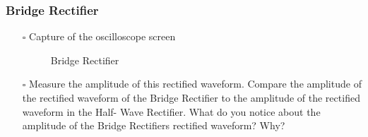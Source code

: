 \documentclass[12pt]{article}
\begin{document}
\subsubsection*{Bridge Rectifier}
\begin{enumerate}
\item[$\square$] Capture of the oscilloscope screen
\begin{figure}[h]
\centering
\caption{Bridge Rectifier}
\label{fig:half-wave}
\end{figure}
\item[$\square$] Measure the amplitude of this rectified waveform.
Compare the amplitude of the rectified waveform of the Bridge
Rectifier to the amplitude of the rectified waveform in the Half-
Wave Rectifier. What do you notice about the amplitude of the
Bridge Rectifiers rectified waveform? Why?
\end{enumerate}
\newpage
\end{document}

